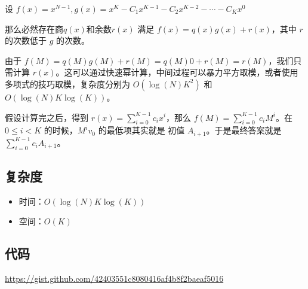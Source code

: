 \documentclass{article}
\begin{document}
设 $f(x) = x^{N-1},g(x) = x^K - C_1 x^{K-1}  - C_2 x^{K-2}  - \cdots - C_K x^{0}$

那么必然存在商$q(x)$和余数$r(x)$ 满足 $f(x) = q(x)g(x) + r(x)$，其中 $r$ 的次数低于 $g$ 的次数。

由于 $f(M) = q(M)g(M) + r(M) = q(M)0 + r(M) = r(M)$，我们只需计算 $r(x)$。这可以通过快速幂计算，中间过程可以暴力平方取模，或者使用多项式的技巧取模，复杂度分别为 $O(\log(N)K^2)$ 和 $O(\log(N)K\log(K))$。

假设计算完之后，得到 $r(x) = \sum_{i=0}^{K-1}c_{i} x^{i}$，那么 $f(M) = \sum_{i=0}^{K-1}c_{i} M^{i}$。在 $0 \le i < K$ 的时候，$M^i v_0$ 的最低项其实就是 初值 $A_{i+1}$。于是最终答案就是 $\sum_{i=0}^{K-1}c_{i} A_{i+1}$。

\subsection*{复杂度}
\begin{itemize}
\item 时间：$O(\log(N)K\log(K))$
\item 空间：$O(K)$
\end{itemize}
\subsection*{代码}
\url{https://gist.github.com/42403551c8080416af4b8f2baeaf5016}
\end{document}
